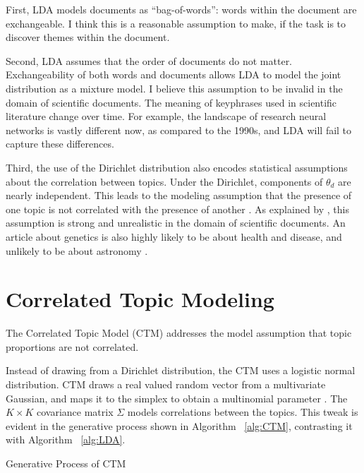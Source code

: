 \documentclass[letterpaper]{article}
\begin{document}
First, LDA models documents as ``bag-of-words'': words within the
document are exchangeable. \cite{blei2003latent} I think this is a
reasonable assumption to make, if the task is to discover themes
within the document.

Second, LDA assumes that the order of documents do not matter.
Exchangeability of both words and documents allows LDA to model the
joint distribution as a mixture model. I believe this assumption to be
invalid in the domain of scientific documents. The meaning of
keyphrases used in scientific literature change over time. For
example, the landscape of research neural networks is vastly different
now, as compared to the 1990s, and LDA will fail to capture these
differences.

Third, the use of the Dirichlet distribution also encodes statistical
assumptions about the correlation between topics. Under the Dirichlet,
components of $\theta_d$ are nearly independent. This leads to the
modeling assumption that the presence of one topic is not correlated
with the presence of another \cite{blei2007correlated}. As explained
by \citeauthor{blei2007correlated}, this assumption is strong and
unrealistic in the domain of scientific documents. An article about
genetics is also highly likely to be about health and disease, and
unlikely to be about astronomy \cite{blei2007correlated}.

\section{Correlated Topic Modeling}
\label{sec:ctm}
The Correlated Topic Model (CTM) addresses the model assumption that
topic proportions are not correlated.

Instead of drawing from a Dirichlet distribution, the CTM uses a
logistic normal distribution. CTM draws a real valued random vector
from a multivariate Gaussian, and maps it to the simplex to obtain a
multinomial parameter \cite{blei2007correlated}. The $K \times K$
covariance matrix $\Sigma$ models correlations between the topics.
This tweak is evident in the generative process shown in Algorithm
~\autoref{alg:CTM}, contrasting it with Algorithm ~\autoref{alg:LDA}.

\begin{algorithm}
  \caption{Generative Process of CTM}\label{alg:CTM}
  \begin{algorithmic}[1]
    \EndFor
    \EndFor
  \end{algorithmic}
\end{algorithm}
\end{document}
